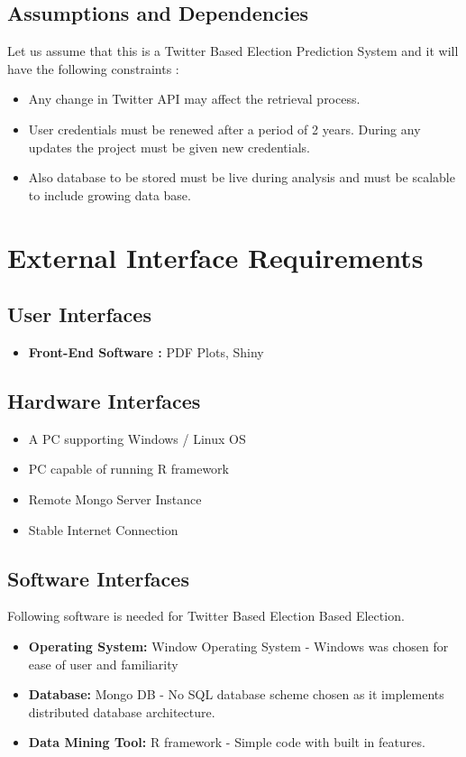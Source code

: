 \documentclass{scrreprt}
\begin{document}
\section{Assumptions and Dependencies}

Let us assume that this is a Twitter Based Election Prediction System and it will have the following constraints :
\begin{itemize} 
	\item Any change in Twitter API may affect the retrieval process.
	\item User credentials must be renewed after a period of 2 years. During any updates the project must be given new credentials.
	\item Also database to be stored must be live during analysis and must be scalable to include growing data base. 
\end{itemize}

\chapter{External Interface Requirements}

\section{User Interfaces}

\begin{itemize}
	\item \textbf{Front-End Software :} PDF Plots, Shiny 
\end{itemize}

\section{Hardware Interfaces}

\begin{itemize}
	\item A PC supporting Windows / Linux OS
	\item PC capable of running R framework
	\item Remote Mongo Server Instance
	\item Stable Internet Connection
\end{itemize}

\section{Software Interfaces}
Following software is needed for Twitter Based Election Based Election. 
\begin{itemize}
	\item \textbf{Operating System:} Window Operating System - Windows was chosen for ease of user and familiarity
	\item \textbf{Database:} Mongo DB - No SQL database scheme chosen as it implements distributed database architecture.
	\item \textbf{Data Mining Tool:} R framework - Simple code with built in features.
\end{itemize}
\end{document}
